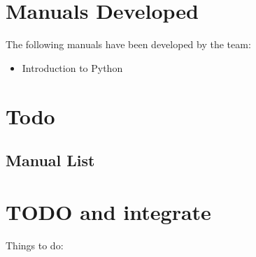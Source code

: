 \documentclass[sigplan,screen]{acmart}
\begin{document}
\appendix

\section{Manuals Developed}

The following manuals have been developed by the team:

\begin{itemize}
    \item Introduction to Python \cite{las-intro-python}
\end{itemize}

\clearpage 

\section{Todo}

\subsection{Manual List}
\section{TODO and integrate}

Things to do: 
\end{document}
